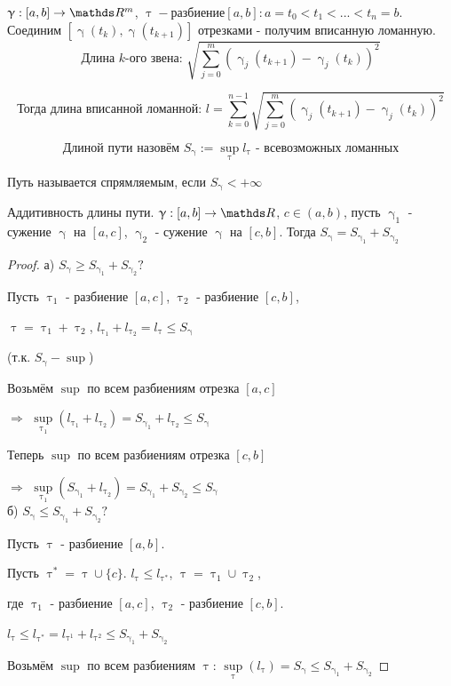 \documentclass[matan]{subfiles}
\begin{document}
  \begin{definition} 
    	$\upgamma: [a,b] \rightarrow \R^m$, $\uptau - разбиение [a,b]: a=t_0<t_1<...<t_n=b$. Соединим $[\upgamma(t_k), \upgamma(t_{k+1})]$ отрезками - получим вписанную ломанную.
      $$\text{Длина $k$-ого звена: }\sqrt{\sum\limits_{j=0}^m (\upgamma_j(t_{k+1}) - \upgamma_j(t_k))^2}$$

      $$\text{Тогда длина вписанной ломанной: }l=\sum\limits_{k=0}^{n-1} \sqrt{\sum\limits_{j=0}^m (\upgamma_j(t_{k+1}) - \upgamma_j(t_k))^2}$$

      $$\text{Длиной пути назовём } S_\upgamma := \sup\limits_{\uptau} l_\uptau\text{ - всевозможных ломанных}$$
  \end{definition}

  \begin{definition}
      Путь называется спрямляемым, если $S_\upgamma < +\infty$
  \end{definition}

  \begin{utv}
      Аддитивность длины пути. $\upgamma: [a,b] \rightarrow \R$, $c \in (a,b)$, пусть $\upgamma_1$ - сужение $\upgamma$ на $[a,c]$, $\upgamma_2$ - сужение $\upgamma$ на $[c,b]$. Тогда $S_\upgamma = S_{\upgamma_1} + S_{\upgamma_2}$
  \end{utv}

  \begin{proof}
      а) $S_\upgamma \geqslant S_{\upgamma_1} + S_{\upgamma_2} ?$

      Пусть $\uptau_1$ - разбиение $[a,c]$, $\uptau_2$ - разбиение $[c,b]$,

      $\uptau = \uptau_1 + \uptau_2$, $l_{\uptau_1} + l_{\uptau_2} = l_\uptau \leqslant S_\upgamma$

      (т.к. $S_\upgamma - \sup$)

      Возьмём $\sup$ по всем разбиениям отрезка $[a,c]$

      $\Rightarrow$ $\sup\limits_{\uptau_1} (l_{\uptau_1} + l_{\uptau_2}) = S_{\upgamma_1} + l_{\uptau_2} \leqslant S_\upgamma$

      Теперь $\sup$ по всем разбиениям отрезка $[c,b]$

      $\Rightarrow$ $\sup\limits_{\uptau_1} (S_{\upgamma_1} + l_{\uptau_2}) = S_{\upgamma_1} + S_{\upgamma_2} \leqslant S_\upgamma$
      \\
      б) $S_\upgamma \leqslant S_{\upgamma_1} + S_{\upgamma_2} ?$

      Пусть $\uptau$ - разбиение $[a,b]$.

      Пусть $\uptau^* = \uptau \cup \{c\}$. $l_\uptau \leqslant l_{\uptau^*}$, $\uptau = \uptau_1 \cup \uptau_2$,

      где $\uptau_1$ - разбиение $[a,c]$, $\uptau_2$ - разбиение $[c,b]$.

      $l_\uptau \leqslant l_{\uptau^*} = l_{\uptau^1} + l_{\uptau^2} \leqslant S_{\upgamma_1} + S_{\upgamma_2}$

      Возьмём $\sup$ по всем разбиениям $\uptau$: $\sup\limits_{\uptau} (l_{\uptau}) = S_\upgamma \leqslant S_{\upgamma_1} + S_{\upgamma_2}$
  \end{proof}
\end{document}
